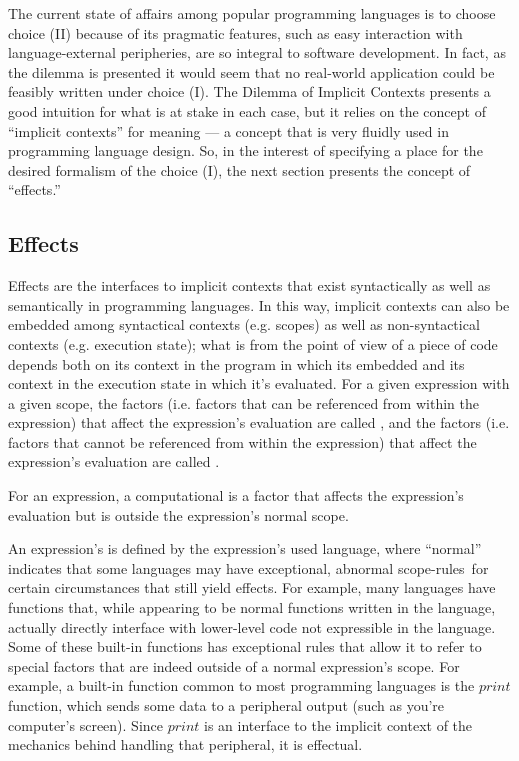 The current state of affairs among popular programming languages is to choose choice (II) because of its pragmatic features, such as easy interaction with language-external peripheries, are so integral to software development.
In fact, as the dilemma is presented it would seem that no real-world application could be feasibly written under choice (I).
The Dilemma of Implicit Contexts presents a good intuition for what is at stake in each case, but it relies on the concept of ``implicit contexts'' for meaning --- a concept that is very fluidly used in programming language design.
So, in the interest of specifying a place for the desired formalism of the choice (I), the next section presents the concept of ``effects.''

\subsection{Effects}
\label{sec:effects}

Effects are the interfaces to implicit contexts that exist syntactically as well as semantically in programming languages.
In this way, implicit contexts can also be embedded among syntactical contexts (e.g. scopes) as well as non-syntactical contexts (e.g. execution state);
what is  from the point of view of a piece of code depends both on its context in the program in which its embedded and its context in the execution state in which it's evaluated.
For a given expression with a given scope,
the  factors (i.e. factors that can be referenced from within the expression) that affect the expression's evaluation are called , and
the  factors (i.e. factors that cannot be referenced from within the expression) that affect the expression's evaluation are called .

\begin{blockdefinition}
  For an expression, a computational  is a factor that affects the expression's evaluation but is outside the expression's normal scope.
\end{blockdefinition}

An expression's  is defined by the expression's used language, where ``normal'' indicates that some languages may have exceptional, abnormal scope-rules for certain circumstances that still yield effects.
For example, many languages have  functions that, while appearing to be normal functions written in the language, actually directly interface with lower-level code not expressible in the language.
Some of these built-in functions has exceptional rules that allow it to refer to special factors that are indeed outside of a normal expression's scope.
For example, a built-in function common to most programming languages is the $print$ function, which sends some data to a peripheral output (such as you're computer's screen).
Since $print$ is an interface to the implicit context of the mechanics behind handling that peripheral, it is effectual.

